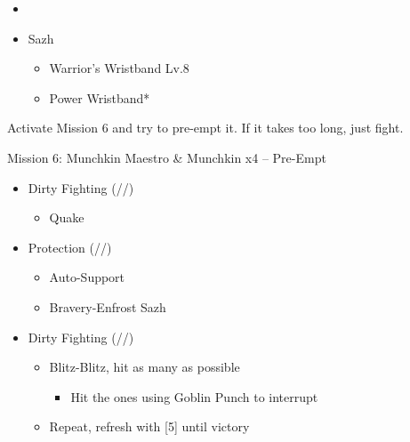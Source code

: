 \begin{menu}
	\begin{itemize}
		\paradigm
		\begin{itemize}
			\item {}%
				  {\paradigmline{(\syn)}{(\med)}{\sen}}%
			      {\paradigmline{\rav}{(\sab)}{\rav}}%
			      {\paradigmline{\syn}{\med}{\com}}%
			      {\paradigmline{(\syn)}{\sab}{\rav}}%
			      {\paradigmline{\com}{(\sab)}{\com}}%
			      {\paradigmline[4]{\com}{\sab}{\sen}}
		\end{itemize}
		\equip
		\begin{itemize}
			\item Sazh
				\begin{itemize}
					\item Warrior's Wristband Lv.8
					\item Power Wristband*
				\end{itemize}
		\end{itemize}
	\end{itemize}
\end{menu}

\renewcommand{\first}{[1] Protection (\syn/\med/\sen)}
\renewcommand{\second}{[2] Smart Bomb (\rav/\sab/\rav}
\renewcommand{\third}{[3] Hero's Charge (\syn/\med/\com)}
\renewcommand{\fourth}{[4] Guerilla (\syn/\sab/\rav)}
\renewcommand{\fifth}{[5] Devastation (\com/\sab/\com)}
\renewcommand{\sixth}{[6] Dirty Fighting (\com/\sab/\sen)}

Activate Mission 6 and try to pre-empt it. If it takes too long, just fight.

\begin{battle}{Mission 6: Munchkin Maestro \& Munchkin x4 -- Pre-Empt}
	\begin{itemize}
		\item \sixth
			\begin{itemize}
				\item Quake
			\end{itemize}
		\item \first
			\begin{itemize}
				\item Auto-Support
				\item Bravery-Enfrost Sazh
			\end{itemize}
		\item \sixth
			\begin{itemize}
				\item Blitz-Blitz, hit as many as possible
					\begin{itemize}
						\item Hit the ones using Goblin Punch to interrupt
					\end{itemize}
				\item Repeat, refresh with [5] until victory
			\end{itemize}
	\end{itemize}
\end{battle}

